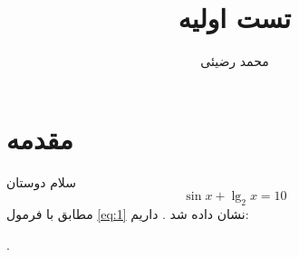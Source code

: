 \documentclass[12pt]{article}
\title{تست اولیه}
\author{محمد رضیئی}
\begin{document}
	\maketitle
	\section{مقدمه}
سلام دوستان
\begin{equation}\label{eq:1}
\sin                   x + \lg_2x = 10
\end{equation}
مطابق با فرمول \eqref{eq:1} نشان داده شد .                         داریم:
\currentpagecolor[lightgray]













\newpage
.
\end{document}
